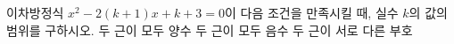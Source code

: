 이차방정식 $x^2-2(k+1)x+k+3=0$이 다음 조건을 만족시킬 때, 실수 $k$의 값의 범위를 구하시오.
 두 근이 모두 양수
 두 근이 모두 음수
 두 근이 서로 다른 부호
